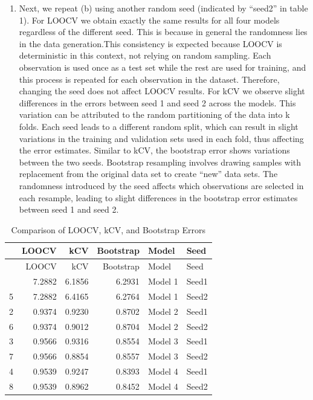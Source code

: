 \documentclass[
]{article}
\providecommand{\tightlist}{%
  \setlength{\itemsep}{0pt}\setlength{\parskip}{0pt}}
\begin{document}
\begin{enumerate}
\def\labelenumi{(\alph{enumi})}
\setcounter{enumi}{2}
\tightlist
\item
  Next, we repeat (b) using another random seed (indicated by ``seed2''
  in table 1). For LOOCV we obtain exactly the same results for all four
  models regardless of the different seed. This is because in general
  the randomness lies in the data generation.This consistency is
  expected because LOOCV is deterministic in this context, not relying
  on random sampling. Each observation is used once as a test set while
  the rest are used for training, and this process is repeated for each
  observation in the dataset. Therefore, changing the seed does not
  affect LOOCV results. For kCV we observe slight differences in the
  errors between seed 1 and seed 2 across the models. This variation can
  be attributed to the random partitioning of the data into k folds.
  Each seed leads to a different random split, which can result in
  slight variations in the training and validation sets used in each
  fold, thus affecting the error estimates. Similar to kCV, the
  bootstrap error shows variations between the two seeds. Bootstrap
  resampling involves drawing samples with replacement from the original
  data set to create ``new'' data sets. The randomness introduced by the
  seed affects which observations are selected in each resample, leading
  to slight differences in the bootstrap error estimates between seed 1
  and seed 2.
\end{enumerate}

\begin{longtable}[]{@{}lrrrll@{}}
\caption{Comparison of LOOCV, kCV, and Bootstrap Errors}\tabularnewline
\toprule\noalign{}
& LOOCV & kCV & Bootstrap & Model & Seed \\
\midrule\noalign{}
\endfirsthead
\toprule\noalign{}
& LOOCV & kCV & Bootstrap & Model & Seed \\
\midrule\noalign{}
\endhead
\bottomrule\noalign{}
\endlastfoot
1 & 7.2882 & 6.1856 & 6.2931 & Model 1 & Seed1 \\
5 & 7.2882 & 6.4165 & 6.2764 & Model 1 & Seed2 \\
2 & 0.9374 & 0.9230 & 0.8702 & Model 2 & Seed1 \\
6 & 0.9374 & 0.9012 & 0.8704 & Model 2 & Seed2 \\
3 & 0.9566 & 0.9316 & 0.8554 & Model 3 & Seed1 \\
7 & 0.9566 & 0.8854 & 0.8557 & Model 3 & Seed2 \\
4 & 0.9539 & 0.9247 & 0.8393 & Model 4 & Seed1 \\
8 & 0.9539 & 0.8962 & 0.8452 & Model 4 & Seed2 \\
\end{longtable}
\end{document}
